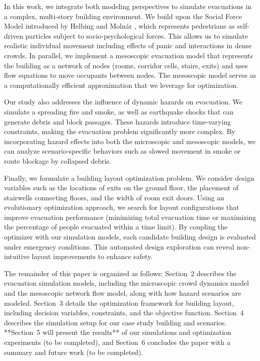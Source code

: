 \documentclass[11pt,a4paper]{article}
\begin{document}
In this work, we integrate both modeling perspectives to simulate evacuations in a complex, multi-story building environment. We build upon the Social Force Model introduced by Helbing and Moln\'ar \cite{helbing1995}, which represents pedestrians as self-driven particles subject to socio-psychological forces. This allows us to simulate realistic individual movement including effects of panic and interactions in dense crowds. In parallel, we implement a mesoscopic evacuation model that represents the building as a network of nodes (rooms, corridor cells, stairs, exits) and uses flow equations to move occupants between nodes. The mesoscopic model serves as a computationally efficient approximation that we leverage for optimization.

Our study also addresses the influence of dynamic hazards on evacuation. We simulate a spreading fire and smoke, as well as earthquake shocks that can generate debris and block passages. These hazards introduce time-varying constraints, making the evacuation problem significantly more complex. By incorporating hazard effects into both the microscopic and mesoscopic models, we can analyze scenario-specific behaviors such as slowed movement in smoke or route blockage by collapsed debris.

Finally, we formulate a building layout optimization problem. We consider design variables such as the locations of exits on the ground floor, the placement of stairwells connecting floors, and the width of room exit doors. Using an evolutionary optimization approach, we search for layout configurations that improve evacuation performance (minimizing total evacuation time or maximizing the percentage of people evacuated within a time limit). By coupling the optimizer with our simulation models, each candidate building design is evaluated under emergency conditions. This automated design exploration can reveal non-intuitive layout improvements to enhance safety. 

The remainder of this paper is organized as follows: Section~2 describes the evacuation simulation models, including the microscopic crowd dynamics model and the mesoscopic network flow model, along with how hazard scenarios are modeled. Section~3 details the optimization framework for building layout, including decision variables, constraints, and the objective function. Section~4 describes the simulation setup for our case study building and scenarios. **Section~5 will present the results** of our simulations and optimization experiments (to be completed), and Section~6 concludes the paper with a summary and future work (to be completed).
\end{document}
